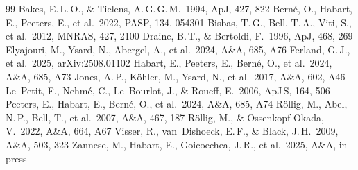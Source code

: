 \documentclass[twocolumn,letterpaper]{article}
\newcommand{\aap}{A\&A}
\newcommand{\apj}{ApJ}
\newcommand{\mnras}{MNRAS}
\begin{document}
\begin{thebibliography}{99}
  Bakes, E.\,L.\,O., \& Tielens, A.\,G.\,G.\,M.\ 1994, \apj, 427, 822
  Bern\'e, O., Habart, E., Peeters, E., et al.\ 2022, PASP, 134, 054301
  Bisbas, T.\,G., Bell, T.\,A., Viti, S., et al.\ 2012, \mnras, 427, 2100
  Draine, B.\,T., \& Bertoldi, F.\ 1996, \apj, 468, 269
  Elyajouri, M., Ysard, N., Abergel, A., et al.\ 2024, \aap, 685, A76
  Ferland, G.\,J., et al.\ 2025, arXiv:2508.01102
  Habart, E., Peeters, E., Bern\'e, O., et al.\ 2024, \aap, 685, A73
  Jones, A.\,P., K\"ohler, M., Ysard, N., et al.\ 2017, \aap, 602, A46
  Le~Petit, F., Nehm\'e, C., Le~Bourlot, J., \& Roueff, E.\ 2006, \apj\,S, 164, 506
  Peeters, E., Habart, E., Bern\'e, O., et al.\ 2024, \aap, 685, A74
  R\"ollig, M., Abel, N.\,P., Bell, T., et al.\ 2007, \aap, 467, 187
  R\"ollig, M., \& Ossenkopf-Okada, V.\ 2022, \aap, 664, A67
  Visser, R., van~Dishoeck, E.\,F., \& Black, J.\,H.\ 2009, \aap, 503, 323
  Zannese, M., Habart, E., Goicoechea, J.\,R., et al.\ 2025, \aap, in press
\end{thebibliography}
\end{document}
